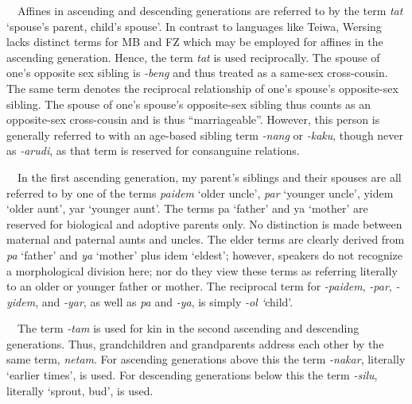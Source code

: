 \ \ Affines in ascending and descending generations are referred to by the term \textit{tat} {\textquoteleft}spouse{\textquoteright}s parent, child{\textquoteright}s spouse{\textquoteright}. In contrast to languages like Teiwa, Wersing lacks distinct terms for MB and FZ which may be employed for affines in the ascending generation. Hence, the term \textit{tat }is used reciprocally. The spouse of one{\textquoteright}s opposite sex sibling is \textit{{}-beng} and thus treated as a same-sex cross-cousin. The same term denotes the reciprocal relationship of one{\textquoteright}s spouse{\textquoteright}s opposite-sex sibling. The spouse of one{\textquoteright}s spouse{\textquoteright}s opposite-sex sibling thus counts as an opposite-sex cross-cousin and is thus {\textquotedblleft}marriageable{\textquotedblright}. However, this person is generally referred to with an age-based sibling term \textit{{}-nang }or \textit{{}-kaku}, though never as \textit{{}-arudi}, as that term is reserved for consanguine relations. 

\ \ In the first ascending generation, my parent{\textquoteright}s siblings and their spouses are all referred to by one of the terms \textit{paidem }{\textquoteleft}older uncle{\textquoteright}, \textit{par }{\textquoteleft}younger uncle{\textquoteright}, yidem {\textquoteleft}older aunt{\textquoteright}, yar {\textquoteleft}younger aunt{\textquoteright}. The terms pa {\textquoteleft}father{\textquoteright} and ya {\textquoteleft}mother{\textquoteright} are reserved for biological and adoptive parents only. No distinction is made between maternal and paternal aunts and uncles. The elder terms are clearly derived from \textit{pa} {\textquoteleft}father{\textquoteright} and \textit{ya} {\textquoteleft}mother{\textquoteright} plus idem {\textquoteleft}eldest{\textquoteright}; however, speakers do not recognize a morphological division here; nor do they view these terms as referring literally to an older or younger father or mother. The reciprocal term for \textit{{}-paidem}, \textit{{}-par}, \textit{{}-yidem}, 
and \textit{{}-yar}, as well as \textit{pa }and \textit{{}-ya}, is simply \textit{{}-ol {\textquoteleft}}child{\textquoteright}. 

\ \ The term \textit{{}-tam }is used for kin in the second ascending and descending generations. Thus, grandchildren and grandparents address each other by the same term, \textit{netam}. For ascending generations above this the term \textit{{}-nakar}, literally {\textquoteleft}earlier times{\textquoteright}, is used. For descending generations below this the term \textit{{}-silu}, literally {\textquoteleft}sprout, bud{\textquoteright}, is used. 

